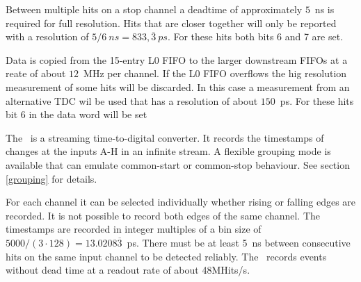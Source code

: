 {    Between multiple hits on a stop channel a deadtime of approximately $5$~ns is required for full resolution. 
    Hits that are closer together will only be reported with a resolution of $5/6~ns = 833,\overline{3}~ps$. For these hits both bits 6 and 7 are set.

    Data is copied from the 15-entry L0 FIFO to the larger downstream FIFOs at a reate of about $12$~MHz per channel. 
    If the L0 FIFO overflows the hig resolution measurement of some hits will be discarded. 
    In this case a measurement from an alternative TDC wil be used that has a resolution of about $150$~ps. 
    For these hits bit 6 in the data word will be set
} { %
    The \deviceName\ is a streaming time-to-digital converter. It records the timestamps of changes at the inputs A-H in an infinite stream. 
    A flexible grouping mode is available that can emulate common-start or common-stop behaviour. See section \ref{grouping} for details.

    For each channel it can be selected individually whether rising or falling edges are recorded. It is not possible to record both edges of the same channel. 
    The timestamps are recorded in integer multiples of a bin size of $5000/(3\cdot 128) = 13.0208\overline{3}$~ps. 
    There must be at least 5~ns between consecutive hits on the same input channel to be detected reliably. 
    The \deviceName\ records events without dead time at a readout rate of about 48MHits/s.
}